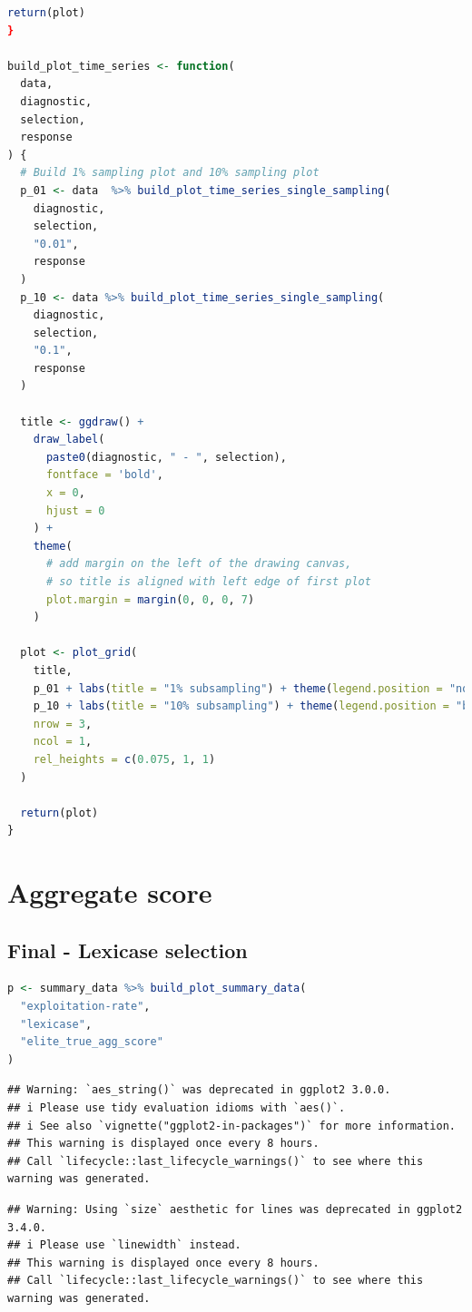 \documentclass[
]{book}
\begin{document}
\begin{lstlisting}[language=R]
  return(plot)
}

build_plot_time_series <- function(
  data,
  diagnostic,
  selection,
  response
) {
  # Build 1% sampling plot and 10% sampling plot
  p_01 <- data  %>% build_plot_time_series_single_sampling(
    diagnostic,
    selection,
    "0.01",
    response
  )
  p_10 <- data %>% build_plot_time_series_single_sampling(
    diagnostic,
    selection,
    "0.1",
    response
  )

  title <- ggdraw() +
    draw_label(
      paste0(diagnostic, " - ", selection),
      fontface = 'bold',
      x = 0,
      hjust = 0
    ) +
    theme(
      # add margin on the left of the drawing canvas,
      # so title is aligned with left edge of first plot
      plot.margin = margin(0, 0, 0, 7)
    )

  plot <- plot_grid(
    title,
    p_01 + labs(title = "1% subsampling") + theme(legend.position = "none"),
    p_10 + labs(title = "10% subsampling") + theme(legend.position = "bottom"),
    nrow = 3,
    ncol = 1,
    rel_heights = c(0.075, 1, 1)
  )

  return(plot)
}
\end{lstlisting}

\hypertarget{aggregate-score}{%
\section{Aggregate score}\label{aggregate-score}}

\hypertarget{final---lexicase-selection}{%
\subsection{Final - Lexicase selection}\label{final---lexicase-selection}}

\begin{lstlisting}[language=R]
p <- summary_data %>% build_plot_summary_data(
  "exploitation-rate",
  "lexicase",
  "elite_true_agg_score"
)
\end{lstlisting}

\begin{lstlisting}
## Warning: `aes_string()` was deprecated in ggplot2 3.0.0.
## i Please use tidy evaluation idioms with `aes()`.
## i See also `vignette("ggplot2-in-packages")` for more information.
## This warning is displayed once every 8 hours.
## Call `lifecycle::last_lifecycle_warnings()` to see where this warning was generated.
\end{lstlisting}

\begin{lstlisting}
## Warning: Using `size` aesthetic for lines was deprecated in ggplot2 3.4.0.
## i Please use `linewidth` instead.
## This warning is displayed once every 8 hours.
## Call `lifecycle::last_lifecycle_warnings()` to see where this warning was generated.
\end{lstlisting}
\end{document}
